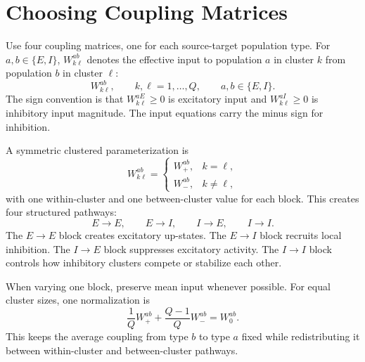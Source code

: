 \section{Choosing Coupling Matrices}
\label{sec:choosing-coupling-matrices}

Use four coupling matrices, one for each source-target population type. For $a,b\in\{E,I\}$, $W^{ab}_{k\ell}$ denotes the effective input to population $a$ in cluster $k$ from population $b$ in cluster $\ell$:
%
\begin{equation}
  W^{ab}_{k\ell},
  \qquad
  k,\ell=1,\ldots,Q,
  \qquad
  a,b\in\{E,I\}.
  \label{eq:ei-coupling-matrix-definition}
\end{equation}
%
The sign convention is that $W^{aE}_{k\ell}\ge 0$ is excitatory input and $W^{aI}_{k\ell}\ge 0$ is inhibitory input magnitude. The input equations carry the minus sign for inhibition.

A symmetric clustered parameterization is
%
\begin{equation}
  W^{ab}_{k\ell}
  =
  \begin{cases}
    W_{+}^{ab}, & k=\ell,\\
    W_{-}^{ab}, & k\ne \ell,
  \end{cases}
  \label{eq:ei-clustered-coupling-blocks}
\end{equation}
%
with one within-cluster and one between-cluster value for each block. This creates four structured pathways:
%
\begin{equation}
  E\to E,\qquad
  E\to I,\qquad
  I\to E,\qquad
  I\to I .
  \label{eq:four-ei-pathways}
\end{equation}
%
The $E\to E$ block creates excitatory up-states. The $E\to I$ block recruits local inhibition. The $I\to E$ block suppresses excitatory activity. The $I\to I$ block controls how inhibitory clusters compete or stabilize each other.

When varying one block, preserve mean input whenever possible. For equal cluster sizes, one normalization is
%
\begin{equation}
  \frac{1}{Q}W_{+}^{ab}
  +
  \frac{Q-1}{Q}W_{-}^{ab}
  =
  W_0^{ab}.
  \label{eq:ei-mean-coupling-normalization}
\end{equation}
%
This keeps the average coupling from type $b$ to type $a$ fixed while redistributing it between within-cluster and between-cluster pathways.

